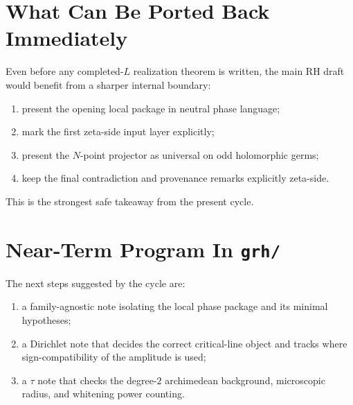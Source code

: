 \documentclass[11pt]{article}
\begin{document}
\section{What Can Be Ported Back Immediately}

Even before any completed-\(L\) realization theorem is written, the main RH
draft would benefit from a sharper internal boundary:

\begin{enumerate}
\item present the opening local package in neutral phase language;
\item mark the first zeta-side input layer explicitly;
\item present the \(N\)-point projector as universal on odd holomorphic germs;
\item keep the final contradiction and provenance remarks explicitly zeta-side.
\end{enumerate}

This is the strongest safe takeaway from the present cycle.

\section{Near-Term Program In \texttt{grh/}}

The next steps suggested by the cycle are:

\begin{enumerate}
\item a family-agnostic note isolating the local phase package and its minimal
hypotheses;
\item a Dirichlet note that decides the correct critical-line object and tracks
where sign-compatibility of the amplitude is used;
\item a \(\tau\) note that checks the degree-\(2\) archimedean background,
microscopic radius, and whitening power counting.
\end{enumerate}
\end{document}
